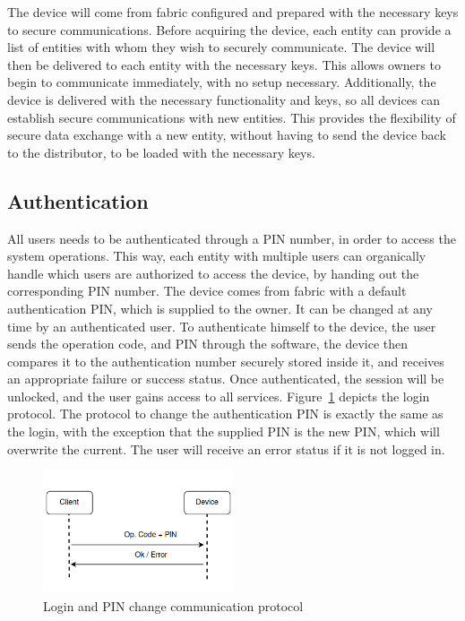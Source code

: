 The device will come from fabric configured and prepared with the necessary keys to secure communications.
Before acquiring the device, each entity can provide a list of entities with whom they wish to securely communicate. The device will then be delivered to each entity with the necessary keys. This allows owners to begin to communicate immediately, with no setup necessary.
Additionally, the device is delivered with the necessary functionality and keys, so all devices can establish secure communications with new entities. This provides the flexibility of secure data exchange with a new entity, without having to send the device back to the distributor, to be loaded with the necessary keys.

\subsection{Authentication}\label{chap:arch:services:auth}

All users needs to be authenticated through a \ac{PIN} number, in order to access the system operations. This way, each entity with multiple users can organically handle which users are authorized to access the device, by handing out the corresponding \ac{PIN} number.
The device comes from fabric with a default authentication \ac{PIN}, which is supplied to the owner. It can be changed at any time by an authenticated user.
To authenticate himself to the device, the user sends the operation code, and \ac{PIN} through the software, the device then compares it to the authentication number securely stored inside it, and receives an appropriate failure or success status. Once authenticated, the session will be unlocked, and the user gains access to all services.
Figure~\ref{fig:protocol:login} depicts the login protocol.
The protocol to change the authentication \ac{PIN} is exactly the same as the login, with the exception that the supplied \ac{PIN} is the new \ac{PIN}, which will overwrite the current. The user will receive an error status if it is not logged in.

\begin{figure}[h!]
	\centering
	\includegraphics[width=0.50\textwidth]{./Images/authentication.png}
	\caption{Login and PIN change communication protocol}
	\label{fig:protocol:login}
\end{figure}

